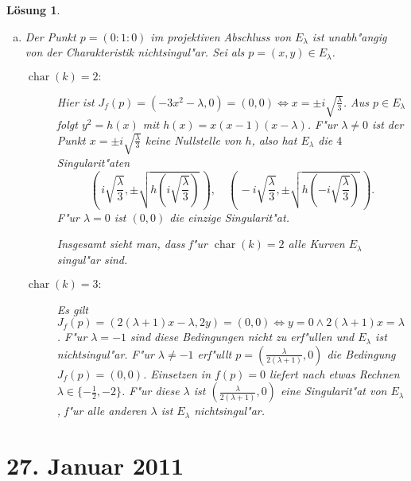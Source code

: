 \documentclass[a4paper, 12pt, numbers=noendperiod, chapterprefix=true]{scrbook}
\theoremstyle{break}
\newtheorem{Loes}{L\"osung}
\theoremstyle{nonumberbreak}
\theoremstyle{nonumberplain}
\newcommand{\pder}[2][]{\frac{\partial #1}{\partial #2}}  %
\DeclareMathOperator{\Char}{char} %
\newcommand{\A}{\mathbb{A}}
\begin{document}
\begin{Loes}
\begin{enumerate}[a)]
\begin{eqnarray*}
		(\pder{X}{F})(p) &=& (-3X^2 + 2 (\lambda+1) XZ - \lambda Z^2)(p) = 0 \\
		(\pder{Y}{F})(p) &=&  (2YZ)(p) = 0\\
		(\pder{Z}{F})(p) &=& (Y^2+(\lambda+1)X^2-2 \lambda XZ)(p) = 1 \neq 0
	\end{eqnarray*}
	Somit ist $p$ f"ur alle $\lambda \in k$ nichtsingul"ar und $\overline{E_\lambda}$ hat genau die Singularit"aten von $E_\lambda$.
\item
	Der Punkt $p=(0:1:0)$ im projektiven Abschluss von $E_\lambda$ ist unabh"angig von der Charakteristik nichtsingul"ar. Sei als $p =(x,y) \in E_\lambda$.
	\begin{description}
	\item[$\Char(k)=2:$]
		Hier ist $J_f(p) = (-3x^2-\lambda, 0) = (0,0) \Leftrightarrow x = \pm i \sqrt{\frac{\lambda}{3}}$. Aus $p \in E_\lambda$ folgt $y^2= h(x)$ mit $h(x) = x(x-1)(x-\lambda)$. F"ur $\lambda \neq 0$ ist der Punkt $x= \pm i \sqrt{\frac{\lambda}{3}}$ keine Nullstelle von $h$, also hat $E_\lambda$ die $4$ Singularit"aten
			\[(\, i\sqrt{\frac{\lambda}{3}} , \pm \sqrt{h\left( i \sqrt{\frac{\lambda}{3}} \right)}\,), \quad 
			(\,-i\sqrt{\frac{\lambda}{3}}, \pm \sqrt{h\left(- i \sqrt{\frac{\lambda}{3}}\right)} \,).\]
		F"ur $\lambda = 0$ ist $(0,0)$ die einzige Singularit"at.

		Insgesamt sieht man, dass f"ur $\Char(k) = 2$ alle Kurven $E_\lambda$ singul"ar sind.
	\item[$\Char(k)=3:$]
		Es gilt $J_f(p) = (2(\lambda+1) x - \lambda , 2y) = (0,0) \Leftrightarrow y = 0 \wedge 2 (\lambda+1)x = \lambda$. F"ur $\lambda = -1$ sind diese Bedingungen nicht zu erf"ullen und $E_\lambda$ ist nichtsingul"ar. F"ur $\lambda \neq -1$ erf"ullt $p = ( \frac{\lambda}{2(\lambda+1)},0)$ die Bedingung $J_f(p)=(0,0)$. Einsetzen in $f(p) = 0$ liefert nach etwas Rechnen $\lambda \in \{ -\frac{1}{2},-2\}$. F"ur diese $\lambda$ ist $( \frac{\lambda}{2(\lambda+1)},0)$ eine Singularit"at von $E_\lambda$, f"ur alle anderen $\lambda$ ist $E_\lambda$ nichtsingul"ar.
	\end{description}
\end{enumerate}\end{Loes}

\newpage
\section{27. Januar 2011}
\setcounter{Aufg}{0}
\setcounter{Loes}{0}
\end{document}
